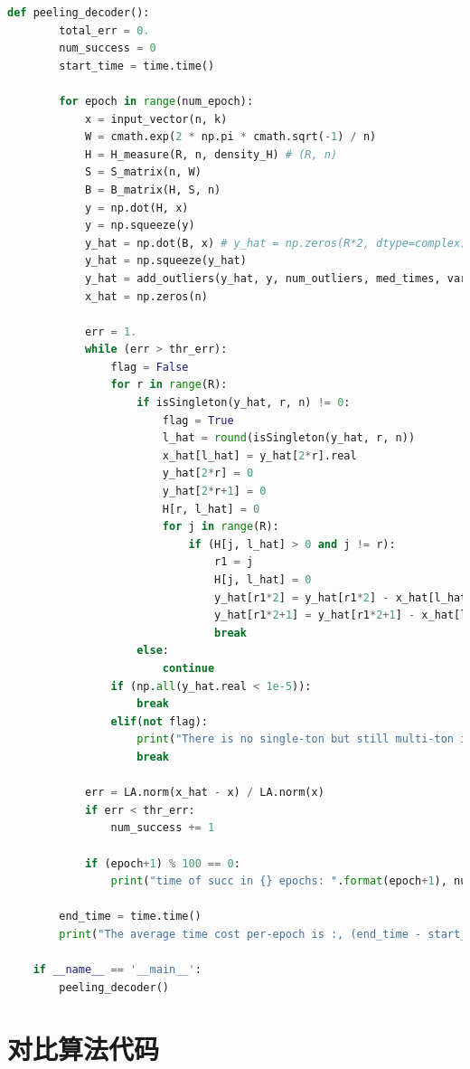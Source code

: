 \documentclass[AutoFakeBold]{LZUThesis}
\begin{document}
\begin{lstlisting}[language = python]
    def peeling_decoder():
        total_err = 0.
        num_success = 0
        start_time = time.time()
        
        for epoch in range(num_epoch):
            x = input_vector(n, k)
            W = cmath.exp(2 * np.pi * cmath.sqrt(-1) / n)
            H = H_measure(R, n, density_H) # (R, n)
            S = S_matrix(n, W)
            B = B_matrix(H, S, n)
            y = np.dot(H, x)
            y = np.squeeze(y)
            y_hat = np.dot(B, x) # y_hat = np.zeros(R*2, dtype=complex)
            y_hat = np.squeeze(y_hat)
            y_hat = add_outliers(y_hat, y, num_outliers, med_times, var_outliers, R=R, W=W)
            x_hat = np.zeros(n)
            
            err = 1.
            while (err > thr_err):
                flag = False
                for r in range(R):
                    if isSingleton(y_hat, r, n) != 0:
                        flag = True
                        l_hat = round(isSingleton(y_hat, r, n))
                        x_hat[l_hat] = y_hat[2*r].real
                        y_hat[2*r] = 0
                        y_hat[2*r+1] = 0
                        H[r, l_hat] = 0
                        for j in range(R):
                            if (H[j, l_hat] > 0 and j != r):
                                r1 = j
                                H[j, l_hat] = 0
                                y_hat[r1*2] = y_hat[r1*2] - x_hat[l_hat]
                                y_hat[r1*2+1] = y_hat[r1*2+1] - x_hat[l_hat] * np.power(W, l_hat)
                                break
                    else:
                        continue
                if (np.all(y_hat.real < 1e-5)):
                    break
                elif(not flag):
                    print("There is no single-ton but still multi-ton in y_hat!\n")
                    break
    
            err = LA.norm(x_hat - x) / LA.norm(x)
            if err < thr_err:
                num_success += 1

            if (epoch+1) % 100 == 0:
                print("time of succ in {} epochs: ".format(epoch+1), num_success)
                
        end_time = time.time()
        print("The average time cost per-epoch is :, (end_time - start_time)/num_epoch)
    
    if __name__ == '__main__':
        peeling_decoder()
\end{lstlisting}

\section{对比算法代码}
\end{document}
